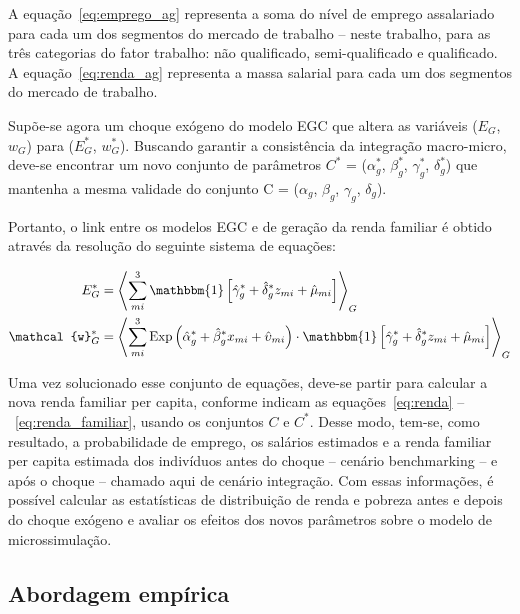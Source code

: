 A equação~\eqref{eq:emprego_ag} representa a soma do nível de emprego assalariado para cada um dos segmentos do mercado de trabalho -- neste trabalho, para as três categorias do fator trabalho: não qualificado, semi-qualificado e qualificado. A equação~\eqref{eq:renda_ag} representa a massa salarial para cada um dos segmentos do mercado de trabalho.

Supõe-se agora um choque exógeno do modelo EGC que altera as variáveis ($E_G$, $w_G$) para ($E_G^*$, $w_G^*$). Buscando garantir a consistência da integração macro-micro, deve-se encontrar um novo conjunto de parâmetros $C^*$ = ($\alpha_g^*$, $\beta_g^*$, $\gamma_g^*$, $\delta_g^*$) que mantenha a mesma validade do conjunto C = ($\alpha_g$, $\beta_g$, $\gamma_g$, $\delta_g$). 

Portanto, o link entre os modelos EGC e de geração da renda familiar é obtido através da resolução do seguinte sistema de equações:

\begin{align}
	E_G^* &= \left\langle \sum_{mi}^{3} \mathbbm{1} \left[ \hat{\gamma}_{g}^* + \hat{\delta}_{g}^* z_{mi} + \hat{\mu}_{mi} \right] \right\rangle_{G} \label{eq:emprego_ag*} \\
	\mathcal{w}_G^* &= \left\langle \sum_{mi}^{3} \text{Exp} \left( \hat{\alpha}_g^* + \hat{\beta}_g^* x_{mi} + \hat{\upsilon}_{mi} \right) \cdot \mathbbm{1} \left[ \hat{\gamma}_{g}^* + \hat{\delta}_{g}^* z_{mi} + \hat{\mu}_{mi} \right] \right\rangle_{G} \label{eq:renda_ag*}
\end{align}

Uma vez solucionado esse conjunto de equações, deve-se partir para calcular a nova renda familiar per capita, conforme indicam as equações~\eqref{eq:renda} --~\eqref{eq:renda_familiar}, usando os conjuntos $C$ e $C^*$. Desse modo, tem-se, como resultado, a probabilidade de emprego, os salários estimados e a renda familiar per capita estimada dos indivíduos antes do choque -- cenário benchmarking -- e após o choque -- chamado aqui de cenário integração. Com essas informações, é possível calcular as estatísticas de distribuição de renda e pobreza antes e depois do choque exógeno e avaliar os efeitos dos novos parâmetros sobre o modelo de microssimulação.


\subsection{Abordagem empírica} \label{subsec:abordagem_empirica}

